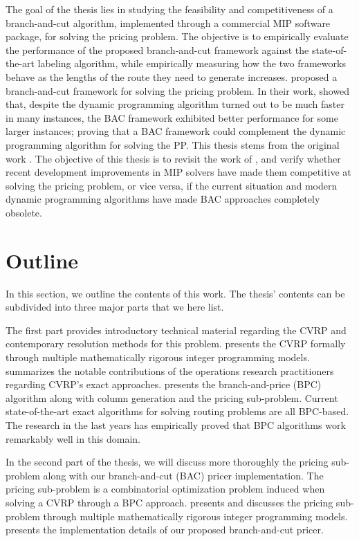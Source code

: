 The goal of the thesis lies in studying the feasibility and competitiveness of a
branch-and-cut algorithm, implemented through a commercial MIP software package,
for solving the pricing problem.
The objective is to empirically evaluate the performance of the proposed
branch-and-cut framework against the state-of-the-art labeling
algorithm, while empirically measuring how the two frameworks behave
as the lengths of the route they need to generate increases.
\cite{jepsen2014} proposed a branch-and-cut framework for solving the pricing problem.
In their work, \citeauthor{jepsen2014} showed that, despite the dynamic programming algorithm
turned out to be much faster in many instances, the BAC framework exhibited
better performance for some larger instances; proving that
a BAC framework could complement the dynamic programming algorithm for solving the PP.
This thesis stems from the original work \citeauthor{jepsen2014}.
The objective of this thesis is to revisit the work of \citeauthor{jepsen2014},
and verify whether recent development improvements in MIP solvers
have made them competitive at solving the pricing problem,
or vice versa,
if the current situation and modern dynamic programming algorithms have
made BAC approaches completely obsolete.

\section{Outline}
\label{sec:intro-outline}

In this section, we outline the contents of this work.
The thesis' contents can be subdivided into three major parts that we here list.

The first part provides introductory technical material
regarding the CVRP and contemporary resolution methods for this problem.
 presents the CVRP formally
through multiple mathematically rigorous integer programming models.
 summarizes the notable contributions
of the operations research practitioners regarding CVRP's exact approaches.
 presents the branch-and-price (BPC) algorithm
along with column generation and the pricing sub-problem.
Current state-of-the-art exact algorithms for solving routing problems
are all BPC-based.
The research in the last years has empirically proved that
BPC algorithms work remarkably well in this domain.

In the second part of the thesis,
we will discuss more thoroughly the pricing sub-problem
along with our branch-and-cut (BAC) pricer implementation.
The pricing sub-problem is a combinatorial optimization problem
induced when solving a CVRP through a BPC approach.
 presents and discusses the pricing sub-problem
through multiple mathematically rigorous integer programming models.
 presents the implementation details of our proposed branch-and-cut pricer.

